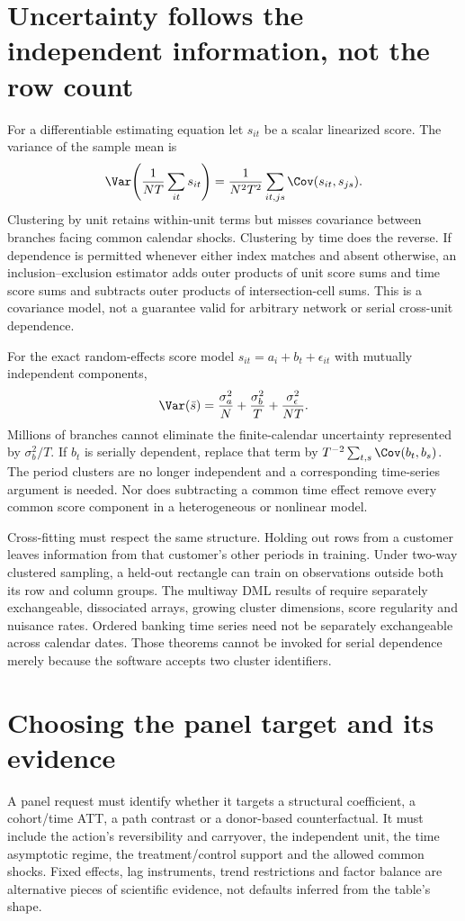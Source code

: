 \section{Uncertainty follows the independent information, not the row count}
\label{r3:panel-inference}
For a differentiable estimating equation let $s_{it}$ be a scalar
linearized score. The variance of the sample mean is
\[
 \Var\!\left(\frac1{NT}\sum_{it}s_{it}\right)
 =\frac1{N^2T^2}\sum_{it,js}\Cov(s_{it},s_{js}).
\]
Clustering by unit retains within-unit terms but misses covariance
between branches facing common calendar shocks. Clustering by time
does the reverse. If dependence is permitted whenever either index
matches and absent otherwise, an inclusion--exclusion estimator adds
outer products of unit score sums and time score sums and subtracts
outer products of intersection-cell sums. This is a covariance model,
not a guarantee valid for arbitrary network or serial cross-unit
dependence.

For the exact random-effects score model
$s_{it}=a_i+b_t+\epsilon_{it}$ with mutually independent components,
\begin{equation}
 \Var(\bar s)=\frac{\sigma_a^2}{N}
             +\frac{\sigma_b^2}{T}
             +\frac{\sigma_\epsilon^2}{NT}.
 \label{r3:panel-information}
\end{equation}
Millions of branches cannot eliminate the finite-calendar uncertainty
represented by $\sigma_b^2/T$. If $b_t$ is serially dependent, replace
that term by $T^{-2}\sum_{t,s}\Cov(b_t,b_s)$. The period
clusters are no longer independent and a corresponding time-series
argument is needed. Nor does subtracting a common time effect remove
every common score component in a heterogeneous or nonlinear model.

Cross-fitting must respect the same structure. Holding out rows from
a customer leaves information from that customer's other periods in
training. Under two-way clustered sampling, a held-out rectangle can
train on observations outside both its row and column groups. The
multiway DML results of \citet[Assumptions 1--3, Theorems 1--2]{cluster2021}
require separately exchangeable, dissociated arrays, growing cluster
dimensions, score regularity and nuisance rates. Ordered banking time
series need not be separately exchangeable across calendar dates.
Those theorems cannot be invoked for serial dependence merely because
the software accepts two cluster identifiers.

\section{Choosing the panel target and its evidence}
A panel request must identify whether it targets a structural coefficient,
a cohort/time ATT, a path contrast or a donor-based counterfactual. It
must include the action's reversibility and carryover, the independent
unit, the time asymptotic regime, the treatment/control support and
the allowed common shocks. Fixed effects, lag instruments, trend
restrictions and factor balance are alternative pieces of scientific
evidence, not defaults inferred from the table's shape.

